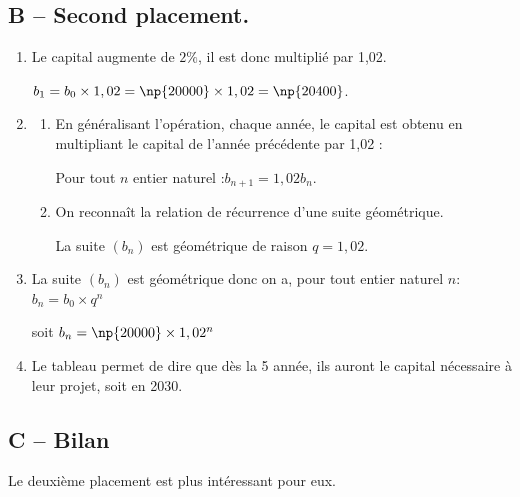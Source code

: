 \subsection*{B -- Second placement.}
	\begin{enumerate}
		\item Le capital augmente de $2\%$, il est donc multiplié par 1,02.

			$b_1=b_0 \times 1,02 = \np{20000} \times 1,02=\np{20400}$.

		\item \begin{enumerate}
			\item En généralisant l'opération, chaque année, le capital est obtenu en multipliant le capital de l'année précédente par 1,02 :

			Pour tout $n$ entier naturel :\quad $b_{n+1}=1,02 b_n$.

			\item On reconnaît la relation de récurrence d'une suite géométrique.

			La suite $(b_n)$ est géométrique de raison $q=1,02$.
		\end{enumerate}

		\item La suite $(b_n)$ est géométrique donc on a, pour tout entier naturel $n$: \quad
		$b_n=b_0 \times q^n$

		soit $b_n= \np{20000} \times 1,02^n$

		\item Le tableau permet de dire que dès la 5 année, ils auront le capital nécessaire à leur projet, soit en 2030.
	\end{enumerate}

\subsection*{C -- Bilan}
	Le deuxième placement est plus intéressant pour eux.
